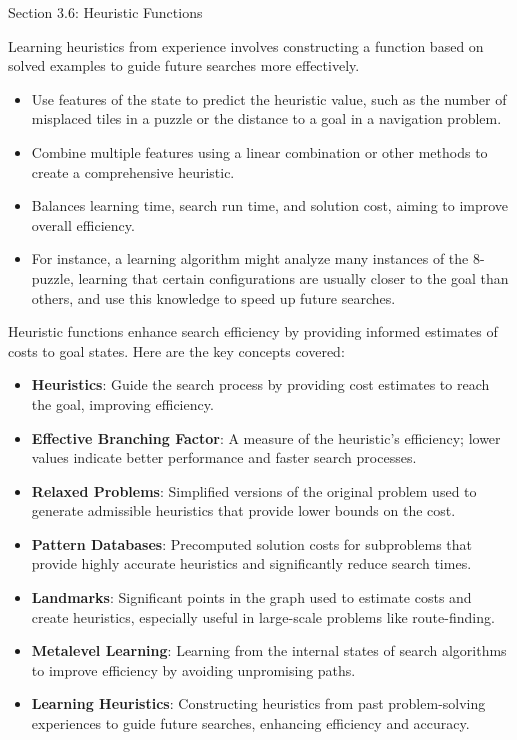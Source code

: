\begin{notes}{Section 3.6: Heuristic Functions}
    \begin{highlight}
    
    Learning heuristics from experience involves constructing a function based on solved examples to guide future searches more effectively.
    
    \begin{itemize}
        \item Use features of the state to predict the heuristic value, such as the number of misplaced tiles in a puzzle or the distance to a goal in a navigation problem.
        \item Combine multiple features using a linear combination or other methods to create a comprehensive heuristic.
        \item Balances learning time, search run time, and solution cost, aiming to improve overall efficiency.
        \item For instance, a learning algorithm might analyze many instances of the 8-puzzle, learning that certain configurations are usually closer to the goal than others, and use this knowledge 
        to speed up future searches.
    \end{itemize}
    
    \end{highlight}
    
    \begin{highlight}
    
    Heuristic functions enhance search efficiency by providing informed estimates of costs to goal states. Here are the key concepts covered:
    
    \begin{itemize}
        \item \textbf{Heuristics}: Guide the search process by providing cost estimates to reach the goal, improving efficiency.
        \item \textbf{Effective Branching Factor}: A measure of the heuristic's efficiency; lower values indicate better performance and faster search processes.
        \item \textbf{Relaxed Problems}: Simplified versions of the original problem used to generate admissible heuristics that provide lower bounds on the cost.
        \item \textbf{Pattern Databases}: Precomputed solution costs for subproblems that provide highly accurate heuristics and significantly reduce search times.
        \item \textbf{Landmarks}: Significant points in the graph used to estimate costs and create heuristics, especially useful in large-scale problems like route-finding.
        \item \textbf{Metalevel Learning}: Learning from the internal states of search algorithms to improve efficiency by avoiding unpromising paths.
        \item \textbf{Learning Heuristics}: Constructing heuristics from past problem-solving experiences to guide future searches, enhancing efficiency and accuracy.
    \end{itemize}
    

\end{highlight}
\end{notes}

